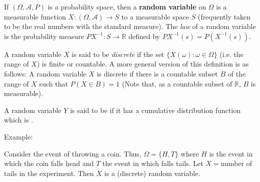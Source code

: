 \documentclass[12pt]{article}
\newcommand{\mc}{\mathcal}
\newcommand{\mb}{\mathbb}
\newcommand{\R}{\mb{R}}
\newcommand{\<}{\langle}
\renewcommand{\>}{\rangle}
\begin{document}
If $(\Omega,\mc{A},P)$ is a probability space, then a \textbf{random variable} on $\Omega$ is a measurable function $X: (\Omega,\mc{A}) \to S$ to a measurable space $S$ (frequently taken to be the real numbers with the standard measure).  The \emph{law} of a random variable is the probability measure $PX^{-1}:S\to \R$ defined by $PX^{-1}(s)=P(X^{-1}(s))$.

A random variable $X$ is said to be \emph{discrete} if the set $ \{X(\omega) : \omega \in \Omega \}$ (i.e. the range of $X$) is finite or countable.  A more general version of this definition is as follows:  A random variable $X$ is discrete if there is a countable subset $B$ of the range of $X$  such that $P(X \in B)=1$ (Note that, as a countable subset of $\mathbb{R}$, $B$ is measurable).

A random variable $Y$ is said to be \emph{} if it has a cumulative distribution function which is .

Example:

Consider the event of throwing a coin. Thus, $\Omega = \{ H, T \}$ where $H$ is the event in which the coin falls head and $T$ the event in which falls tails.
Let $X=$number of tails in the experiment. Then $X$ is a (discrete) random variable.
\end{document}
